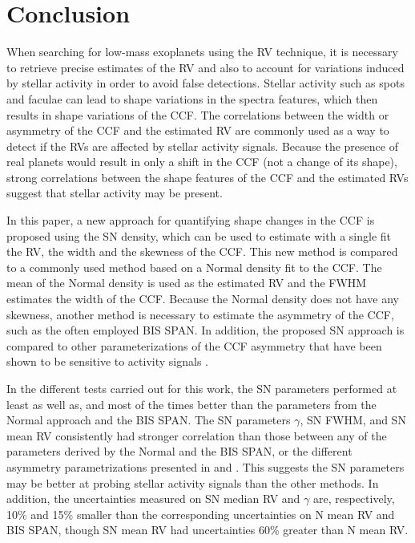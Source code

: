 \documentclass{aa}
\begin{document}
\section{Conclusion} \label{sec:conclu}

When searching for low-mass exoplanets using the RV technique, it is necessary to retrieve precise estimates of the RV and also to account for variations induced by stellar activity in order to avoid false detections.  
Stellar activity such as spots and faculae can lead to shape variations in the spectra features, which then results in shape variations of the CCF.
The correlations between the width or asymmetry of the CCF and the estimated RV are commonly used as a way to detect if the RVs are affected by stellar activity signals.   
Because the presence of real planets would result in only a shift in the CCF (not a change of its shape), strong correlations between the shape features of the CCF and the estimated RVs suggest that stellar activity may be present.



In this paper, a new approach for quantifying shape changes in the CCF is proposed using the SN density, which can be used to estimate with a single fit the RV, the width and the skewness of the CCF. 
This new method is compared to a commonly used method based on a Normal density fit to the CCF.  The mean of the Normal density is used as the estimated RV and the FWHM estimates the width of the CCF.  Because the Normal density does not have any skewness, another method is necessary to estimate the asymmetry of the CCF, such as the often employed BIS SPAN.
In addition, the proposed SN approach is compared to other parameterizations of the CCF asymmetry that have been shown to be sensitive to activity signals \citep[][]{Boisse-2011,Figueira-2013}.

In the different tests carried out for this work, the SN parameters performed at least as well as, and most of the times better than the parameters from the Normal approach and the BIS SPAN.
The SN parameters $\gamma$, SN FWHM, and SN mean RV consistently had stronger correlation than those between any of the parameters derived by the Normal and the BIS SPAN, or the different asymmetry parametrizations presented in \citet{Boisse-2011} and \citet{Figueira-2013}. 
This suggests the SN parameters may be better at probing stellar activity signals than the other methods. 
In addition, the uncertainties measured on SN median RV and $\gamma$ are, respectively, 10\% and 15\% smaller than the corresponding uncertainties on N mean RV and BIS SPAN, though SN mean RV had uncertainties 60\% greater than N mean RV.
\end{document}
